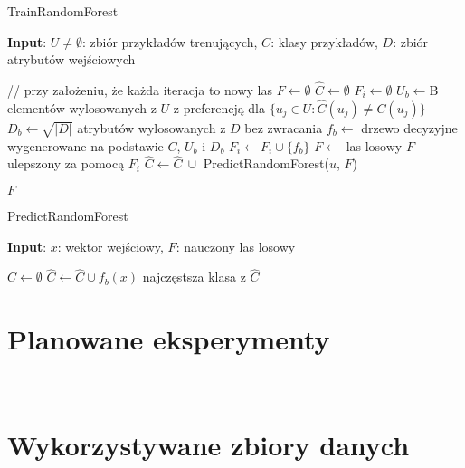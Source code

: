 \documentclass[10pt,a4paper]{article}
\begin{document}
\begin{algorithm}
	\caption{TrainRandomForest}\label{alg:caprf_train}
	\hspace*{\algorithmicindent} \textbf{Input}: $U\neq \emptyset$: zbiór przykładów trenujących, $C$: klasy przykładów, $D$: zbiór atrybutów wejściowych
\begin{algorithmic}[1]
	\State 	// przy założeniu, że każda iteracja to nowy las
	\State $F \gets \emptyset$
	\State $\hat C \gets \emptyset$
		\State $F_i \gets \emptyset$
			\State $U_b \gets $B elementów wylosowanych z $U$ z preferencją dla $\{u_j \in U: \hat C(u_j) \neq C(u_j)\}$
			\State $D_b \gets \sqrt{|D|} $ atrybutów wylosowanych z $D$ bez zwracania
			\State $f_b \gets $ drzewo decyzyjne wygenerowane na podstawie $C$, $U_b$ i $D_b$
			\State $F_i \gets F_i \cup \{f_b\}$
		\EndFor
		\State $F \gets $ las losowy $F$ ulepszony za pomocą $F_i$
			\State $\hat C \gets \hat C\ \cup$ PredictRandomForest($u$, $F$)
		\EndFor
		
	\EndFor
	\State \Return $F$
\end{algorithmic}
\end{algorithm}

\begin{algorithm}
\caption{PredictRandomForest}\label{alg:rf_predict}
\hspace*{\algorithmicindent} \textbf{Input}: $x$: wektor wejściowy, $F$: nauczony las losowy
\begin{algorithmic}[1]
	\State $\hat C \gets \emptyset$
		\State $\hat C \gets \hat C \cup {f_b(x)}$
	\EndFor
	\State \Return najczęstsza klasa z $\hat C$
\end{algorithmic}
\end{algorithm}

\section{Planowane eksperymenty}\

\section{Wykorzystywane zbiory danych}
\end{document}
